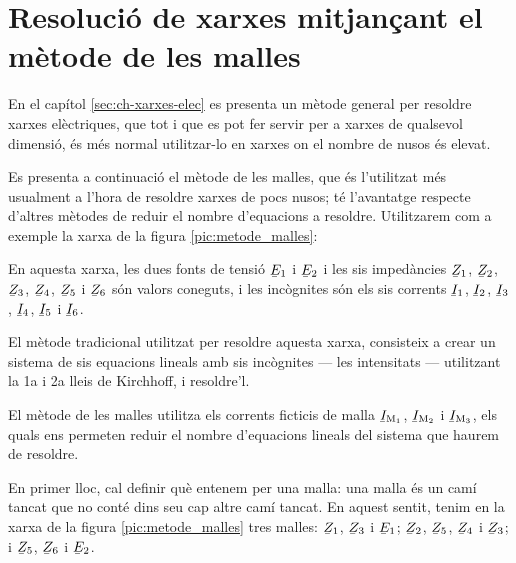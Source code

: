 \section{Resolució de xarxes mitjançant el mètode de les malles}\label{sec:metode-malles}

En el capítol \ref{sec:ch-xarxes-elec} es presenta un mètode general per resoldre xarxes elèctriques, que tot i que es pot fer servir per a xarxes de qualsevol dimensió, és més normal utilitzar-lo en xarxes on el nombre de nusos és elevat.

Es presenta a continuació el mètode de les malles, que és l'utilitzat més usualment a l'hora de resoldre xarxes de pocs nusos; té l'avantatge respecte d'altres mètodes de reduir el nombre d'equacions a resoldre. Utilitzarem com a exemple la xarxa de la figura \vref{pic:metode_malles}:

\begin{center}
    
     \label{pic:metode_malles}
\end{center}

En aquesta xarxa, les dues fonts de tensió $\cmplx{E}_1$ i $\cmplx{E}_2$ i les sis impedàncies $\cmplx{Z}_1$, $\cmplx{Z}_2$, $\cmplx{Z}_3$, $\cmplx{Z}_4$, $\cmplx{Z}_5$ i $\cmplx{Z}_6$  són valors coneguts, i les incògnites són els sis corrents $\cmplx{I}_1$, $\cmplx{I}_2$, $\cmplx{I}_3$, $\cmplx{I}_4$, $\cmplx{I}_5$ i $\cmplx{I}_6$.

El mètode tradicional utilitzat per  resoldre aquesta xarxa, consisteix a crear un sistema  de sis equacions lineals amb sis incògnites --- les intensitats --- utilitzant  la 1a i 2a lleis de Kirchhoff, i resoldre'l.

El mètode de les malles utilitza els corrents ficticis de malla $\cmplx{I}\ped{M_1}$, $\cmplx{I}\ped{M_2}$ i $\cmplx{I}\ped{M_3}$, els quals ens permeten reduir el nombre d'equacions lineals del  sistema que haurem de resoldre.



En primer lloc, cal definir què entenem per una malla: una malla és un camí tancat que no conté dins seu cap altre camí tancat. En aquest sentit, tenim en la xarxa de la figura \vref{pic:metode_malles} tres malles: $\cmplx{Z}_1$, $\cmplx{Z}_3$ i $\cmplx{E}_1$; $\cmplx{Z}_2$, $\cmplx{Z}_5$, $\cmplx{Z}_4$ i $\cmplx{Z}_3$; i $\cmplx{Z}_5$, $\cmplx{Z}_6$ i $\cmplx{E}_2$.

